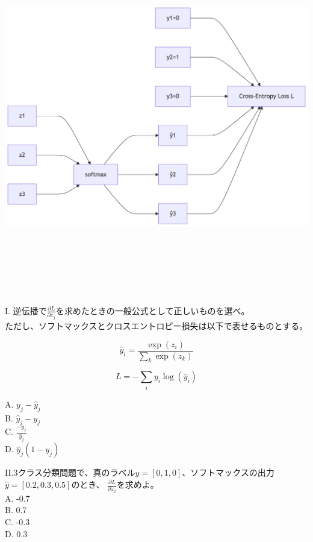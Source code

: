 \documentclass[
  letterpaper,
  DIV=11,
  numbers=noendperiod]{scrreprt}
\begin{document}
\includegraphics[width=8.42in,height=6.15in]{chapters/part3/02_optimization_files/figure-latex/mermaid-figure-1.png}

I.
逆伝播で\(\frac{∂𝐿}{∂𝑧_j}\)を求めたときの一般公式として正しいものを選べ。\\
ただし、ソフトマックスとクロスエントロピー損失は以下で表せるものとする。

\[
\hat{y}_i = \frac{\exp(z_i)}{\sum_{k} \exp(z_k)}
\]

\[
L = - \sum_{i} y_i \log(\hat{y}_i)
\]

A. \(𝑦_j−\hat{y}_j\)\\
B. \(\hat{y}_j-𝑦_j\)\\
C. \(\frac{-y_j}{\hat{y}_j}\)\\
D. \(\hat{y}_j(1-𝑦_j)\)

II.3クラス分類問題で、真のラベル\(y = [0,1,0]\)、ソフトマックスの出力\(\hat{y}=[0.2, 0.3, 0.5]\)のとき、
\(\frac{∂𝐿}{∂𝑧_2}\)を求めよ。\\
A. -0.7\\
B. 0.7\\
C. -0.3\\
D. 0.3
\end{document}
